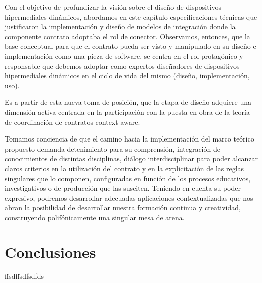 
Con el objetivo de profundizar la visión sobre el diseño de dispositivos hipermediales
dinámicos, abordamos en este capítulo especificaciones técnicas que
justificaron la implementación y diseño de modelos de integración donde la
componente contrato adoptaba el rol de conector.
Observamos, entonces, que la base conceptual para que el contrato pueda
ser visto y manipulado en su diseño e implementación como una pieza de software,
se centra en el rol protagónico y responsable que debemos adoptar como
expertos diseñadores de dispositivos hipermediales dinámicos en el ciclo de
vida del mismo (diseño, implementación, uso).

Es a partir de esta nueva toma de posición, que la etapa de diseño adquiere
una dimensión activa centrada en la participación con la puesta en obra de
la teoría de coordinación de contratos context-aware.

Tomamos conciencia de que el camino hacia la implementación del
marco teórico propuesto demanda detenimiento para su comprensión, integración
de conocimientos de distintas disciplinas, diálogo interdisciplinar
para poder alcanzar claros criterios en la utilización del contrato y en la explicitación
de las reglas singulares que lo componen, configuradas en función de
los procesos educativos, investigativos o de producción que las susciten.
Teniendo en cuenta su poder expresivo, podremos desarrollar adecuadas
aplicaciones contextualizadas que nos abran la posibilidad de desarrollar nuestra
formación continua y creatividad, construyendo polifónicamente una singular
mesa de arena.


\section{Conclusiones}


ffsdffsdfsdfds


